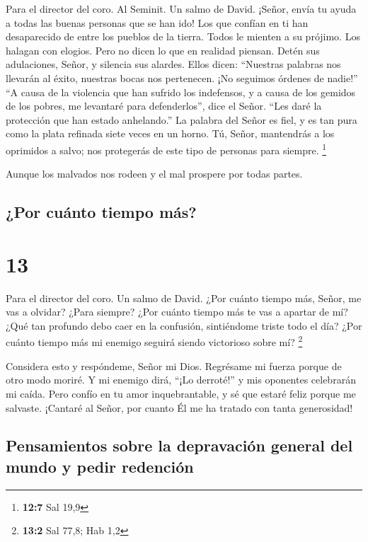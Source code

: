 Para el director del coro. Al Seminit. Un salmo de David. 
¡Señor, envía tu ayuda a todas las buenas personas que se han ido! Los
que confían en ti han desaparecido de entre los pueblos de la tierra.
 Todos le mienten a su prójimo. Los halagan con elogios.
Pero no dicen lo que en realidad piensan.  Detén sus
adulaciones, Señor, y silencia sus alardes.  Ellos dicen:
``Nuestras palabras nos llevarán al éxito, nuestras bocas nos
pertenecen. ¡No seguimos órdenes de nadie!''  ``A causa de
la violencia que han sufrido los indefensos, y a causa de los gemidos de
los pobres, me levantaré para defenderlos'', dice el Señor. ``Les daré
la protección que han estado anhelando.''  La palabra del
Señor es fiel, y es tan pura como la plata refinada siete veces en un
horno.  Tú, Señor, mantendrás a los oprimidos a salvo; nos
protegerás de este tipo de personas para siempre. \footnote{\textbf{12:7}
  Sal 19,9}

 Aunque los malvados nos rodeen y el mal prospere por todas
partes.

\hypertarget{por-cuuxe1nto-tiempo-muxe1s}{%
\subsection{¿Por cuánto tiempo más?}\label{por-cuuxe1nto-tiempo-muxe1s}}

\hypertarget{section-12}{%
\section{13}\label{section-12}}

Para el director del coro. Un salmo de David.  ¿Por cuánto
tiempo más, Señor, me vas a olvidar? ¿Para siempre? ¿Por cuánto tiempo
más te vas a apartar de mí?  ¿Qué tan profundo debo caer en
la confusión, sintiéndome triste todo el día? ¿Por cuánto tiempo más mi
enemigo seguirá siendo victorioso sobre mí? \footnote{\textbf{13:2} Sal
  77,8; Hab 1,2}

 Considera esto y respóndeme, Señor mi Dios. Regrésame mi
fuerza porque de otro modo moriré.  Y mi enemigo dirá, ``¡Lo
derroté!'' y mis oponentes celebrarán mi caída.  Pero confío
en tu amor inquebrantable, y sé que estaré feliz porque me salvaste.
 ¡Cantaré al Señor, por cuanto Él me ha tratado con tanta
generosidad!

\hypertarget{pensamientos-sobre-la-depravaciuxf3n-general-del-mundo-y-pedir-redenciuxf3n}{%
\subsection{Pensamientos sobre la depravación general del mundo y pedir
redención}\label{pensamientos-sobre-la-depravaciuxf3n-general-del-mundo-y-pedir-redenciuxf3n}}

